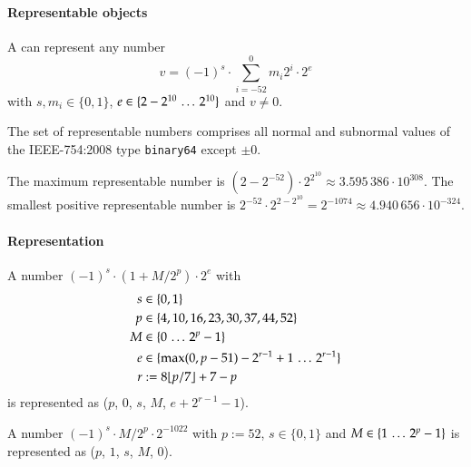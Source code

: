 \paragraph{Representable objects}

A \DborBinaryRationalValue{} can represent any number
\begin{equation}
    v = (-1)^s \cdot \sum_{i = -52}^0 m_i 2^i \cdot 2^e
\end{equation}
with $s, m_i \in \{0, 1\}$, $e \in \{2 - 2^{10} \,\ldots\, 2^{10}\}$ and $v \ne 0$.

The set of representable numbers comprises all normal and subnormal values of the IEEE-754:2008 type
\texttt{binary64} except $\pm 0$.

\smallskip
The maximum representable number is $(2 - 2^{-52}) \cdot 2^{2^{10}} \approx 3.595\,386 \cdot 10^{308}$.
The smallest positive representable number is $2^{-52} \cdot 2^{2-2^{10}} = 2^{-1074}
\approx 4.940\,656 \cdot 10^{-324}$.

\paragraph{Representation}

A number $(-1)^s \cdot (1 + M/2^p) \cdot 2^e$ with
\begin{align*}
    s & \in \{0, 1\} \\
    p & \in \{4, 10, 16, 23, 30, 37, 44, 52\} \\
    M & \in \{0 \,\ldots\, 2^p - 1\} \\
    e & \in \{\max(0, p - 51) - 2^{r - 1} + 1 \,\ldots\, 2^{r - 1}\} \\
    r & := 8 \lfloor p / 7 \rfloor + 7 - p
\end{align*}%
is represented as
\DborBinaryRationalToken*($p$, $0$, $s$, $M$, $e + 2^{r - 1} - 1$).

A number $(-1)^s \cdot M/2^p \cdot 2^{-1022}$ with $p := 52$, $s \in \{0, 1\}$ and
$M \in \{1 \,\ldots\, 2^p - 1\}$ is represented as \DborBinaryRationalToken*($p$, $1$, $s$, $M$, $0$).

